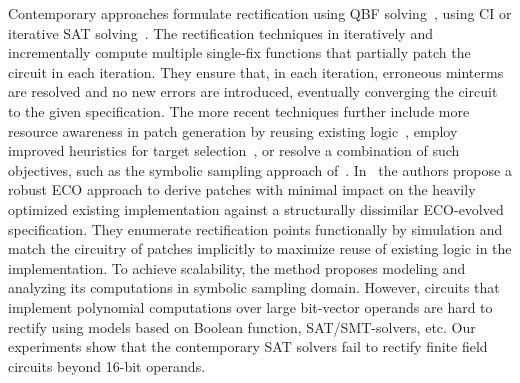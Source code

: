 Contemporary approaches formulate rectification
using QBF solving~\cite{scholl:2}, using CI or iterative SAT
solving~\cite{MF_Roland:ICCAD10,MF_Huang:DATE12}.  
The rectification techniques in 
\cite{fujita:2015,SS_Fujita:ISCAS19,MF_Huang:DATE12,SS_Roland:DAC18} 
iteratively and incrementally compute multiple single-fix functions
that partially patch the circuit in each iteration.
{\red They ensure that, in each iteration, erroneous minterms are resolved
and no new errors are introduced, eventually converging the circuit
to the given specification.}
The more recent techniques further
include more resource awareness in patch generation by reusing
existing logic~\cite{SS_Alan:DAC18}, employ improved heuristics for
target selection~\cite{SS_Fujita:ISCAS19}, or resolve a combination of
such objectives, such as the symbolic sampling approach of~\cite{SS_Roland:DAC19}.
{\red In~\cite{SS_Roland:DAC19} the authors propose a robust ECO approach to derive 
patches with minimal impact on the heavily optimized existing implementation 
against a structurally dissimilar ECO-evolved specification. 
They enumerate rectification points 
functionally by simulation and match the circuitry of patches implicitly 
to maximize reuse of existing logic in the implementation. To achieve 
scalability, the method proposes modeling and analyzing its computations 
in symbolic sampling domain. However, circuits that implement polynomial 
computations over large bit-vector operands are hard to rectify using 
models based on Boolean function, SAT/SMT-solvers, etc.
Our experiments show that the contemporary SAT solvers fail to rectify 
finite field circuits beyond 16-bit operands.}


